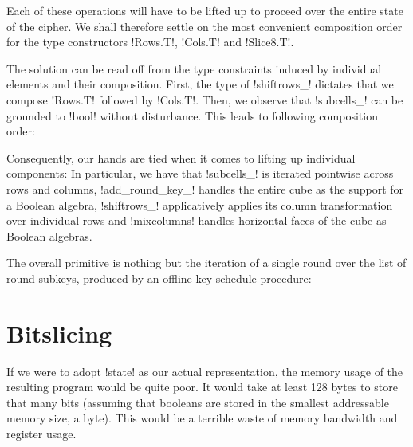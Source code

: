 \documentclass[draft,english]{jflart}
\begin{document}
Each of these operations will have to be lifted up to proceed over the
entire state of the cipher. We shall therefore settle on the most
convenient composition order for the type constructors \coqe!Rows.T!,
\coqe!Cols.T! and \coqe!Slice8.T!.


The solution can be read off from the type constraints induced by
individual elements and their composition. First, the type of
\coqe!shiftrows_! dictates that we compose \coqe!Rows.T! followed by
\coqe!Cols.T!. Then, we observe that \coqe!subcells_! can be grounded
to \coqe!bool! without disturbance. This leads to following 
composition order:
%


Consequently, our hands are tied when it comes to lifting up
individual components:
%
%
In particular, we have that \coqe!subcells_! is iterated pointwise
across rows and columns, \coqe!add_round_key_! handles the entire cube
as the support for a Boolean algebra, \coqe!shiftrows_! applicatively
applies its column transformation over individual rows and
\coqe!mixcolumns! handles horizontal faces of the cube as Boolean
algebras.


The overall primitive is nothing but the iteration of a single round
over the list of round subkeys, produced by an offline key schedule
procedure:
%

\section{Bitslicing}
\label{sec:bitslicing}


If we were to adopt \coqe!state! as our actual representation, the
memory usage of the resulting program would be quite poor. It would take
at least 128 bytes to store that many bits (assuming that booleans are
stored in the smallest addressable memory size, a byte). This would be
a terrible waste of memory bandwidth and register usage.
\end{document}
